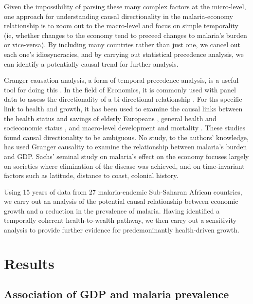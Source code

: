 \documentclass[9pt,twocolumn,twoside,lineno]{pnas-new}
\begin{document}
Given the impossibility of parsing these many complex factors at the micro-level, one approach for understanding causal directionality in the malaria-economy relationship is to zoom out to the macro-level and focus on simple temporality (ie, whether changes to the economy tend to preceed changes to malaria’s burden or vice-versa). By including many countries rather than just one, we cancel out each one’s idiosyncracies, and by carrying out statistical precedence analysis, we can identify a potentially causal trend for further analysis. 

Granger-causation analysis, a form of temporal precedence analysis, is a useful tool for doing this \cite{Granger_undated-wn, Molenaar2018-ss, Koller2016-rv, Granger1896-di, Clarke_JA2016-ik}. In the field of Economics, it is commonly used with panel data to assess the directionality of a bi-directional relationship \cite{Law_2013, Joerding1986}. For ths specific link to health and growth, it has been used to examine the causal links between the health status and savings of elderly Europeans \cite{Andreyeva2007-zq}, general health and socieconomic status \cite{Adams2003-wl}, and macro-level development and mortality \cite{Clarke_JA2016-ik}. These studies found causal directionality to be ambiguous. No study, to the authors’ knowledge, has used Granger causality to examine the relationship between malaria’s burden and GDP. Sachs' seminal study on malaria's effect on the economy \cite{Sachs2002-ig} focuses largely on societies where elimination of the disease was achieved, and on time-invariant factors such as latitude, distance to coast, colonial history.

Using 15 years of data from 27 malaria-endemic Sub-Saharan African countries, we carry out an analysis of the potential causal relationship between economic growth and a reduction in the prevalence of malaria. Having identified a temporally coherent health-to-wealth pathway, we then carry out a sensitivity analysis to provide further evidence for predemoninantly health-driven growth.

\section*{Results}

\subsection*{Association of GDP and malaria prevalence}
\end{document}
